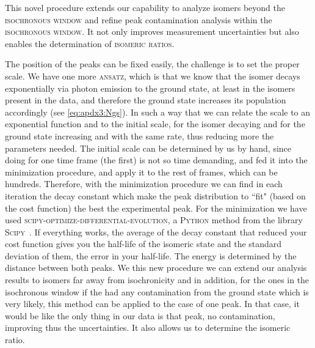 This novel procedure extends our capability to analyze isomers beyond the \textsc{isochronous window} and refine peak contamination analysis within the \textsc{isochronous window}. It not only improves measurement uncertainties but also enables the determination of \textsc{isomeric ratios}.

The position of the peaks can be fixed easily, the challenge is to set the proper scale. We have one more \textsc{ansatz}, which is that we know that the isomer decays exponentially via photon emission to the ground state, at least in the isomers present in the data, and therefore the ground state increases its population accordingly (see \cref{eq:apdx3:Ngs}). 
In such a way that we can relate the scale to an exponential function and to the initial scale, for the isomer decaying and for the ground state increasing and with the same rate, thus reducing more the parameters needed. The initial scale can be determined by us by hand, since doing for one time frame (the first) is not so time demanding, and fed it into the minimization procedure, and apply it to the rest of frames, which can be hundreds. 
Therefore, with the minimization procedure we can find in each iteration the decay constant which make the peak distribution to ``fit" (based on the cost function) the best the experimental peak. 
For the minimization we have used \textsc{scipy-optimize-differential-evolution}, a \textsc{Python} method from the library \textsc{Scipy}~\cite{scipy}.
If everything works, the average of the decay constant that reduced your cost function gives you the half-life of the isomeric state and the standard deviation of them, the error in your half-life. The energy is determined by the distance between both peaks.
We this new procedure we can extend our analysis results to isomers far away from isochronicity and in addition, for the ones in the isochronous window if the had any contamination from the ground state which is very likely, this method can be applied to the case of one peak. In that case, it would be like the only thing in our data is that peak, no contamination, improving thus the uncertainties. It also allows us to determine the isomeric ratio.

